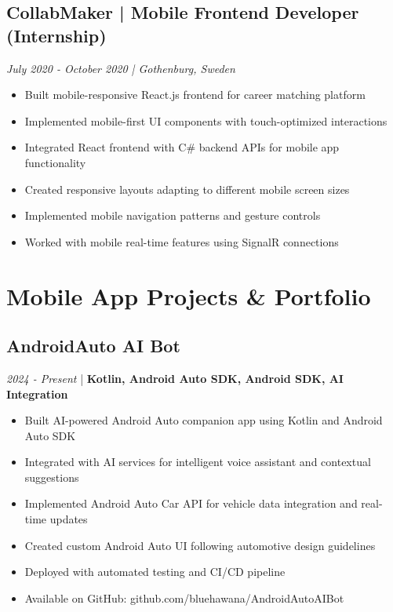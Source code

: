 \documentclass[11pt,a4paper]{article}
\begin{document}
\subsection*{CollabMaker | Mobile Frontend Developer (Internship)}
\textit{July 2020 - October 2020 | Gothenburg, Sweden}

\begin{itemize}[leftmargin=*, itemsep=2pt]
\item Built mobile-responsive React.js frontend for career matching platform
\item Implemented mobile-first UI components with touch-optimized interactions
\item Integrated React frontend with C\# backend APIs for mobile app functionality
\item Created responsive layouts adapting to different mobile screen sizes
\item Implemented mobile navigation patterns and gesture controls
\item Worked with mobile real-time features using SignalR connections
\end{itemize}

\section*{Mobile App Projects \& Portfolio}

\subsection*{AndroidAuto AI Bot}
\textit{2024 - Present} | \textbf{Kotlin, Android Auto SDK, Android SDK, AI Integration}
\begin{itemize}[leftmargin=*, itemsep=1pt]
\item Built AI-powered Android Auto companion app using Kotlin and Android Auto SDK
\item Integrated with AI services for intelligent voice assistant and contextual suggestions
\item Implemented Android Auto Car API for vehicle data integration and real-time updates
\item Created custom Android Auto UI following automotive design guidelines
\item Deployed with automated testing and CI/CD pipeline
\item Available on GitHub: github.com/bluehawana/AndroidAutoAIBot
\end{itemize}
\end{document}
